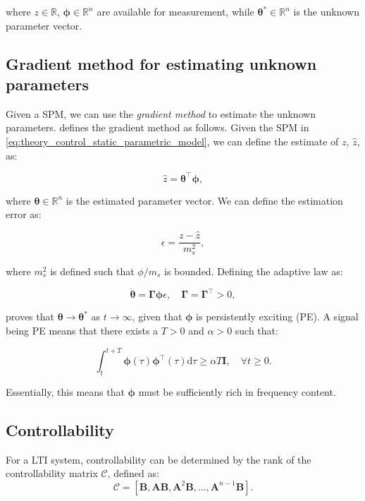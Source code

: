 where $z \in \mathbb{R}$, $\boldsymbol{\phi} \in \mathbb{R}^n$ are available for measurement, while $\boldsymbol{\theta}^* \in \mathbb{R}^n$ is the unknown parameter vector. 

\subsection{Gradient method for estimating unknown parameters}
\label{subsec:theory_gradient_method}
Given a SPM, we can use the \textit{gradient method} to estimate the unknown parameters. \cite[p. 180--185]{ioannouRobustAdaptiveControl2012} defines the gradient method as follows. Given the SPM in \cref{eq:theory_control_static_parametric_model}, we can define the estimate of $z$, $\hat{z}$, as:

\begin{equation}
    \hat{z} = \boldsymbol{\theta}^\intercal \boldsymbol{\phi},
\end{equation}

where $\boldsymbol{\theta} \in \mathbb{R}^n$ is the estimated parameter vector. We can define the estimation error as:

\begin{equation}
    \epsilon = \frac{z - \hat{z}}{m_s^2},
\end{equation}

where $m_s^2$ is defined such that $\phi/m_s$ is bounded. Defining the adaptive law as:

\begin{equation}
    \dot{\boldsymbol{\theta}} = \boldsymbol{\Gamma} \boldsymbol{\phi} \epsilon, \quad \boldsymbol{\Gamma} = \boldsymbol{\Gamma}^\intercal > 0,
\end{equation}

\cite{ioannouRobustAdaptiveControl2012} proves that $\mathbf{\theta} \to \mathbf{\theta}^*$ as $t \to \infty$, given that $\boldsymbol{\phi}$ is persistently exciting (PE). A signal being PE means that there exists a $T > 0$ and $\alpha > 0$ such that:

\begin{equation}
    \int_{t}^{t+T} \boldsymbol{\phi}(\tau) \boldsymbol{\phi}^\intercal(\tau) \mathrm{d}\tau \geq \alpha T \mathbf{I}, \quad \forall t \geq 0.
\end{equation}

Essentially, this means that $\boldsymbol{\phi}$ must be sufficiently rich in frequency content.

\subsection{Controllability}%
\label{subsec:theory_control_controllability}
For a LTI system, controllability can be determined by the rank of the controllability matrix $\mathcal{C}$, defined as:
\begin{equation}
    \mathcal{C} = [\mathbf{B}, \mathbf{A}\mathbf{B}, \mathbf{A}^2\mathbf{B}, \ldots, \mathbf{A}^{n-1}\mathbf{B}].
\end{equation}

